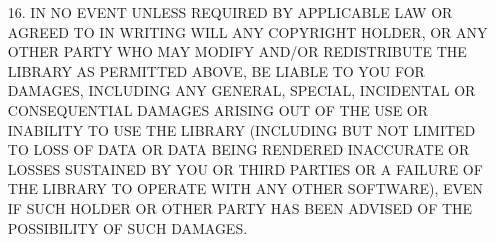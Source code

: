 \begin{multicols}{3}
\begin{itemize}
\item[16.] IN NO EVENT UNLESS REQUIRED BY APPLICABLE LAW OR AGREED TO
  IN WRITING WILL ANY COPYRIGHT HOLDER, OR ANY OTHER PARTY WHO MAY
  MODIFY AND/OR REDISTRIBUTE THE LIBRARY AS PERMITTED ABOVE, BE LIABLE
  TO YOU FOR DAMAGES, INCLUDING ANY GENERAL, SPECIAL, INCIDENTAL OR
  CONSEQUENTIAL DAMAGES ARISING OUT OF THE USE OR INABILITY TO USE THE
  LIBRARY (INCLUDING BUT NOT LIMITED TO LOSS OF DATA OR DATA BEING
  RENDERED INACCURATE OR LOSSES SUSTAINED BY YOU OR THIRD PARTIES OR A
  FAILURE OF THE LIBRARY TO OPERATE WITH ANY OTHER SOFTWARE), EVEN IF
  SUCH HOLDER OR OTHER PARTY HAS BEEN ADVISED OF THE POSSIBILITY OF
  SUCH DAMAGES.
\end{itemize}
\end{multicols}
